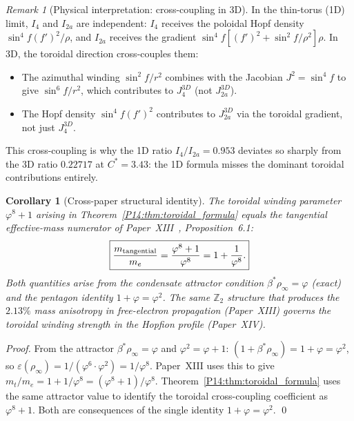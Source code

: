 \documentclass[11pt,a4paper]{article}
\newtheorem{corollary}[theorem]{Corollary}
\theoremstyle{definition}
\theoremstyle{remark}
\newtheorem{remark}[theorem]{Remark}
\newcommand{\vp}{\varphi}
\newcommand{\bst}{\beta^{*}}
\newcommand{\Jfour}{J_4}
\newcommand{\Ja}{J_{2a}}
\newcommand{\Cstar}{C^*}
\begin{document}
\begin{remark}[Physical interpretation: cross-coupling in 3D]
\label{P14:rem:cross_coupling}
In the thin-torus (1D) limit, $I_4$ and $I_{2a}$ are independent:
$I_4$ receives the poloidal Hopf density $\sin^4\!f(f')^2/\rho$, and
$I_{2a}$ receives the gradient $\sin^4\!f[(f')^2+\sin^2\!f/\rho^2]\rho$.
In 3D, the toroidal direction cross-couples them:
\begin{itemize}[noitemsep]
\item The azimuthal winding $\sin^2\!f/r^2$ combines with the Jacobian
  $J^2=\sin^4\!f$ to give $\sin^6\!f/r^2$, which contributes to
  $\Jfour^{3D}$ (not $\Ja^{3D}$).
\item The Hopf density $\sin^4\!f(f')^2$ contributes to
  $\Ja^{3D}$ via the toroidal gradient, not just $\Jfour^{3D}$.
\end{itemize}
This cross-coupling is why the 1D ratio $I_4/I_{2a}=0.953$ deviates
so sharply from the 3D ratio $0.22717$ at $\Cstar=3.43$:
the 1D formula misses the dominant toroidal contributions entirely.
\end{remark}

\begin{corollary}[Cross-paper structural identity]
\label{P14:cor:phi8_structural}
The toroidal winding parameter $\vp^8+1$ arising in
Theorem~\ref{P14:thm:toroidal_formula} equals the tangential effective-mass
numerator of Paper~XIII~\cite{Paper13},
Proposition~6.1:
\begin{equation}
  \boxed{\frac{m_{\rm tangential}}{m_e}
  = \frac{\vp^8+1}{\vp^8}
  = 1 + \frac{1}{\vp^8}.}
  \label{P14:eq:phi8_identity}
\end{equation}
Both quantities arise from the condensate attractor condition
$\bst\rho_\infty=\vp$ (exact) and the pentagon identity $1+\vp=\vp^2$.
The same $\mathbb{Z}_2$ structure that produces the $2.13\%$ mass
anisotropy in free-electron propagation (Paper~XIII) governs the
toroidal winding strength in the Hopfion profile (Paper~XIV).
\end{corollary}

\begin{proof}
From the attractor $\bst\rho_\infty=\vp$ and $\vp^2=\vp+1$:
$(1+\bst\rho_\infty)=1+\vp=\vp^2$, so $\varepsilon(\rho_\infty)=1/(\vp^6\cdot\vp^2)=1/\vp^8$.
Paper~XIII uses this to give $m_t/m_e=1+1/\vp^8=(\vp^8+1)/\vp^8$.
Theorem~\ref{P14:thm:toroidal_formula} uses the same attractor value to
identify the toroidal cross-coupling coefficient as $\vp^8+1$.
Both are consequences of the single identity $1+\vp=\vp^2$.
\qed
\end{proof}
\end{document}

